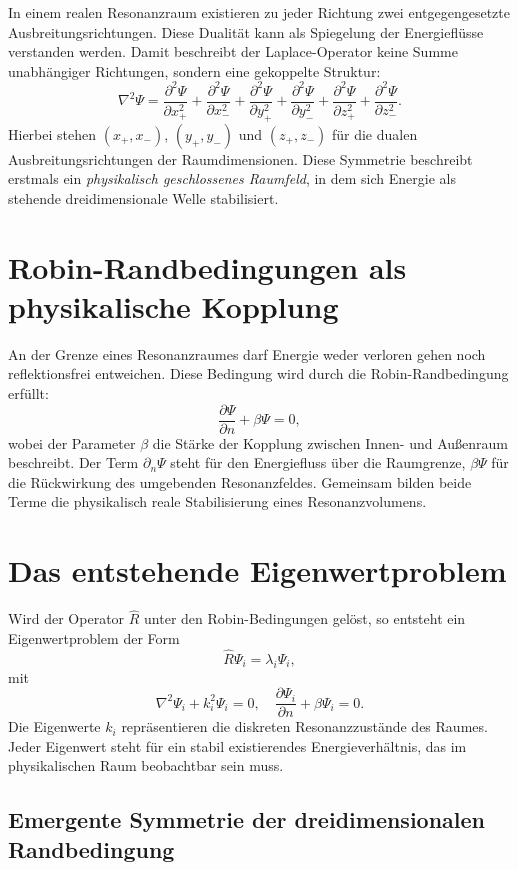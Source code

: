 In einem realen Resonanzraum existieren zu jeder Richtung zwei entgegengesetzte Ausbreitungsrichtungen.
Diese Dualität kann als Spiegelung der Energieflüsse verstanden werden.
Damit beschreibt der Laplace-Operator keine Summe unabhängiger Richtungen,
sondern eine gekoppelte Struktur:
\[
\nabla^2 \Psi =
\frac{\partial^2 \Psi}{\partial x_+^2} +
\frac{\partial^2 \Psi}{\partial x_-^2} +
\frac{\partial^2 \Psi}{\partial y_+^2} +
\frac{\partial^2 \Psi}{\partial y_-^2} +
\frac{\partial^2 \Psi}{\partial z_+^2} +
\frac{\partial^2 \Psi}{\partial z_-^2}.
\]
Hierbei stehen $(x_+,x_-)$, $(y_+,y_-)$ und $(z_+,z_-)$
für die dualen Ausbreitungsrichtungen der Raumdimensionen.
Diese Symmetrie beschreibt erstmals ein \emph{physikalisch geschlossenes Raumfeld},
in dem sich Energie als stehende dreidimensionale Welle stabilisiert.

\section{Robin-Randbedingungen als physikalische Kopplung}

An der Grenze eines Resonanzraumes darf Energie weder verloren gehen noch reflektionsfrei entweichen.
Diese Bedingung wird durch die Robin-Randbedingung erfüllt:
\[
\frac{\partial \Psi}{\partial n} + \beta \Psi = 0,
\]
wobei der Parameter $\beta$ die Stärke der Kopplung zwischen Innen- und Außenraum beschreibt.
Der Term $\partial_n \Psi$ steht für den Energiefluss über die Raumgrenze,
$\beta \Psi$ für die Rückwirkung des umgebenden Resonanzfeldes.
Gemeinsam bilden beide Terme die physikalisch reale Stabilisierung eines Resonanzvolumens.

\section{Das entstehende Eigenwertproblem}

Wird der Operator $\hat{R}$ unter den Robin-Bedingungen gelöst,
so entsteht ein Eigenwertproblem der Form
\[
\hat{R}\Psi_i = \lambda_i \Psi_i,
\]
mit
\[
\nabla^2 \Psi_i + k_i^2 \Psi_i = 0, \quad
\frac{\partial \Psi_i}{\partial n} + \beta \Psi_i = 0.
\]
Die Eigenwerte $k_i$ repräsentieren die diskreten Resonanzzustände des Raumes.
Jeder Eigenwert steht für ein stabil existierendes Energieverhältnis,
das im physikalischen Raum beobachtbar sein muss.

\newpage

\subsection{Emergente Symmetrie der dreidimensionalen Randbedingung}


